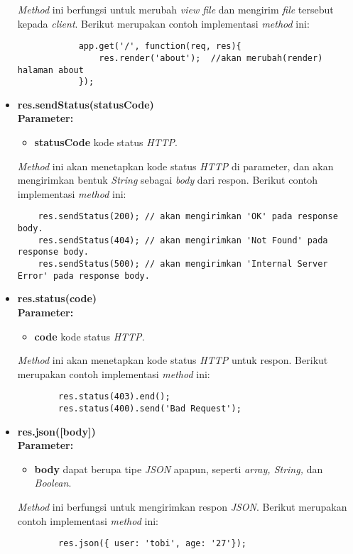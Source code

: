 \begin{itemize}
		\textit{Method} ini berfungsi untuk merubah \textit{view file} dan mengirim \textit{file} tersebut kepada \textit{client}. Berikut merupakan contoh implementasi \textit{method} ini:
		\begin{lstlisting}
			app.get('/', function(req, res){
				res.render('about');  //akan merubah(render) halaman about 
			});
		\end{lstlisting}
		
	\item \textbf{res.sendStatus(statusCode)} \\ \textbf{Parameter:} 
	\begin{itemize}
		\item \textbf{statusCode} kode status \textit{HTTP}.
	\end{itemize}

	\textit{Method} ini akan menetapkan kode status \textit{HTTP} di parameter, dan akan mengirimkan bentuk \textit{String} sebagai \textit{body} dari respon. Berikut contoh implementasi \textit{method} ini:
	\begin{lstlisting}
	res.sendStatus(200); // akan mengirimkan 'OK' pada response body.
	res.sendStatus(404); // akan mengirimkan 'Not Found' pada response body.
	res.sendStatus(500); // akan mengirimkan 'Internal Server Error' pada response body.
	\end{lstlisting}
	
	\item \textbf{res.status(code)} \\ \textbf{Parameter:}
	\begin{itemize}
		\item \textbf{code} kode status \textit{HTTP}.
	\end{itemize}

	\textit{Method} ini akan menetapkan kode status \textit{HTTP} untuk respon. Berikut merupakan contoh implementasi \textit{method} ini:
	\begin{lstlisting}
		res.status(403).end();
		res.status(400).send('Bad Request');
	\end{lstlisting}
	
	\item \textbf{res.json([body])} \\ \textbf{Parameter:}
	\begin{itemize}
		\item \textbf{body} dapat berupa tipe \textit{JSON} apapun, seperti \textit{array, String,} dan \textit{Boolean}.
	\end{itemize}

	\textit{Method} ini berfungsi untuk mengirimkan respon \textit{JSON}. Berikut merupakan contoh implementasi \textit{method} ini:
	\begin{lstlisting}
		res.json({ user: 'tobi', age: '27'});
	\end{lstlisting}
	
\end{itemize}

